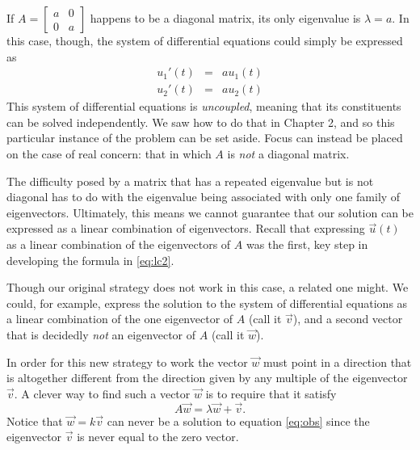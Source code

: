 \documentclass[../book.tex]{subfiles}
\begin{document}
If \(A = \begin{bmatrix}a & 0 \\ 0 & a\end{bmatrix}\) happens to be a diagonal matrix, its only eigenvalue is \(\lambda =a\). In this case, though, the system of differential equations could simply be expressed as
\begin{equation}\label{eq:sys-31}
\begin{array}{lcl}
  u_1'(t) &=& a u_1(t) \\
  u_2'(t) &=& a u_2(t)
\end{array}
\end{equation}
This system of differential equations is \emph{uncoupled}, meaning that its constituents can be solved independently. We saw how to do that in Chapter 2, and so this particular instance of the problem can be set aside. Focus can instead be placed on the case of real concern: that in which \(A\) is \emph{not} a diagonal matrix.

The difficulty posed by a matrix that has a repeated eigenvalue but is not diagonal has to do with the eigenvalue being associated with only one family of eigenvectors. Ultimately, this means we cannot guarantee that our solution can be expressed as a linear combination of eigenvectors. Recall that expressing \(\vec{u}(t)\) as a linear combination of the eigenvectors of \(A\) was the first, key step in developing the formula in \eqref{eq:lc2}.

Though our original strategy does not work in this case, a related one might. We could, for example, express the solution to the system of differential equations as a linear combination of the one eigenvector of \(A\) (call it \(\vec{v}\)), and a second vector that is decidedly \emph{not} an eigenvector of \(A\) (call it \(\vec{w}\)).

In order for this new strategy to work the vector \(\vec{w}\)  must point in a direction that is altogether different from the direction given by any multiple of the eigenvector \(\vec{v}\). A clever way to find such a vector \(\vec{w}\) is to require that it satisfy
\begin{equation} \label{eq:obs}
  A \vec{w} = \lambda  \vec{w} + \vec{v}.
\end{equation} 
Notice that \(\vec{w} = k \vec{v}\) can never be a solution to equation \eqref{eq:obs} since the eigenvector \(\vec{v}\) is never equal to the zero vector.
\end{document}
